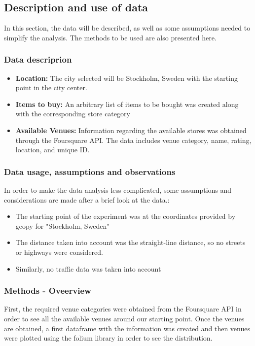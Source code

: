 \documentclass{article}
\begin{document}
	\subsection{Description and use of data}
		In this section, the data will be described, as well as some assumptions needed to simplify the analysis. The methods to be used are also presented here. 
		
		\subsubsection{Data descriprion}
		\begin{itemize}
			\item \textbf{Location:} The city selected will be Stockholm, Sweden with the starting point in the city center.
			\item \textbf{Items to buy:} An arbitrary list of items to be bought was created along with the corresponding store category
			\item \textbf{Available Venues:} Information regarding the available stores was obtained through the Foursquare API. The data includes venue category, name, rating, location, and unique ID.				
		\end{itemize}
		\subsubsection{Data usage, assumptions and observations}
			In order to make the data analysis less complicated, some assumptions and considerations are made after a brief look at the data.:
			\begin{itemize}
				\item The starting point of the experiment was at the coordinates provided by geopy for "Stockholm, Sweden"
				\item The distance taken into account was the straight-line distance, so no streets or highways were considered.
				\item Similarly, no traffic data was taken into account			
			\end{itemize} 	
		\newpage
		\subsubsection{Methods - Oveerview}
			First, the required venue categories were obtained from the Foursquare API in order to see all the available venues around our starting point. Once the venues are obtained, a first dataframe with the information was created and then venues were plotted using the folium library in order to see the distribution. 
			
\end{document}
